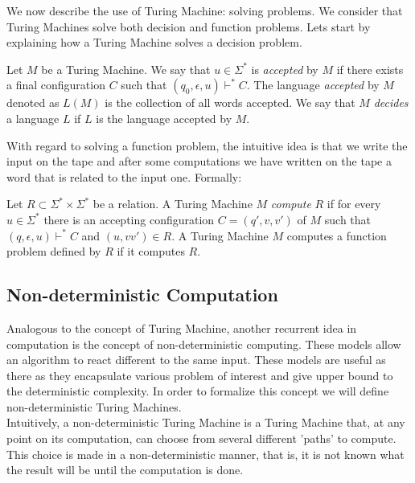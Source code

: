   
  We now describe the use of Turing Machine: solving problems. We consider that Turing Machines solve both decision and function problems. Lets start by explaining how a Turing Machine solves a decision problem.

  \begin{definition}
     Let $M$ be a Turing Machine. We say that $u\in\Sigma^*$ is \emph{accepted} by $M$ if there exists a final configuration $C$ such that $(q_0,\epsilon,u)\vdash^* C$. The language \emph{accepted} by $M$ denoted as $L(M)$ is the collection of all words accepted. We say that $M$ \emph{decides} a language $L$ if $L$ is the language accepted by $M$.
  \end{definition}

  With regard to solving a function problem, the intuitive idea is that we write the input on the tape and after some computations we have written on the tape a word that is related to the input one. Formally:


  \begin{definition}
    Let $R\subset\Sigma^*\times \Sigma^*$ be a relation. A Turing Machine $M$ \emph{compute} $R$ if for every $u\in \Sigma^*$ there is an accepting configuration $C=(q',v,v')$ of $M$  such that $(q,\epsilon,u)\vdash^* C$ and $(u,vv') \in R$. A Turing Machine $M$ computes a function problem defined by $R$ if it computes $R$.
  \end{definition}


  

  \subsection{Non-deterministic Computation}
Analogous to the concept of Turing Machine, another recurrent idea in computation is the concept of non-deterministic computing. These models allow an algorithm to react different to the same input. These models are useful as there as they encapsulate various problem of interest and give upper bound to the deterministic complexity. In order to formalize this concept we will define non-deterministic Turing Machines.\\

Intuitively, a non-deterministic Turing Machine is a Turing Machine that, at any point on its computation, can choose from several different 'paths' to compute. This choice is made in a non-deterministic manner, that is, it is not known what the result will be until the computation is done.

